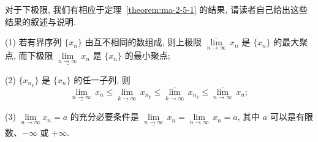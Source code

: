 \begin{remark}\label{remark:ma-2-source-106}
对于下极限, 我们有相应于定理~\ref{theorem:ma-2-5-1} 的结果, 请读者自己给出这些结果的叙述与说明.
\end{remark}


\begin{theorem}\label{theorem:ma-2-5-2}
(1) 若有界序列 $\{x_n\}$ 由互不相同的数组成, 则上极限 $\overline{\lim\limits_{n\to\infty}}\,x_n$ 是 $\{x_n\}$ 的最大聚点, 而下极限 $\underline{\lim\limits_{n\to\infty}}\,x_n$ 是 $\{x_n\}$ 的最小聚点;

(2) $\{x_{n_k}\}$ 是 $\{x_n\}$ 的任一子列, 则
\[
  \underline{\lim_{n\to\infty}}\,x_n
  \leqslant
  \underline{\lim_{k\to\infty}}\,x_{n_k}
  \leqslant
  \overline{\lim_{k\to\infty}}\,x_{n_k}
  \leqslant
  \overline{\lim_{n\to\infty}}\,x_n;
\]

(3) $\lim\limits_{n\to\infty}x_n=a$ 的充分必要条件是 $\underline{\lim\limits_{n\to\infty}}\,x_n=\overline{\lim\limits_{n\to\infty}}\,x_n=a$, 其中 $a$ 可以是有限数、$-\infty$ 或 $+\infty$.
\end{theorem}



